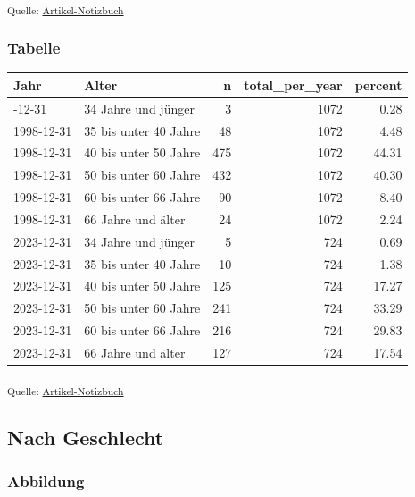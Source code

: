 \documentclass[
  ngerman,
  number,
  preprint,
  3p,
  twocolumn]{elsarticle}
\begin{document}
\textsubscript{Quelle:
\href{https://jakobschumacher.github.io/Update-Facharztmangel-im-oeffentlichen-Gesundheitsdienst/index.qmd.html}{Artikel-Notizbuch}}

\subsubsection{Tabelle}\label{tabelle-2}

\begin{longtable}[]{@{}llrrr@{}}
\toprule\noalign{}
Jahr & Alter & n & total\_per\_year & percent \\
\midrule\noalign{}
\endhead
\bottomrule\noalign{}
\endlastfoot
1998-12-31 & 34 Jahre und jünger & 3 & 1072 & 0.28 \\
1998-12-31 & 35 bis unter 40 Jahre & 48 & 1072 & 4.48 \\
1998-12-31 & 40 bis unter 50 Jahre & 475 & 1072 & 44.31 \\
1998-12-31 & 50 bis unter 60 Jahre & 432 & 1072 & 40.30 \\
1998-12-31 & 60 bis unter 66 Jahre & 90 & 1072 & 8.40 \\
1998-12-31 & 66 Jahre und älter & 24 & 1072 & 2.24 \\
2023-12-31 & 34 Jahre und jünger & 5 & 724 & 0.69 \\
2023-12-31 & 35 bis unter 40 Jahre & 10 & 724 & 1.38 \\
2023-12-31 & 40 bis unter 50 Jahre & 125 & 724 & 17.27 \\
2023-12-31 & 50 bis unter 60 Jahre & 241 & 724 & 33.29 \\
2023-12-31 & 60 bis unter 66 Jahre & 216 & 724 & 29.83 \\
2023-12-31 & 66 Jahre und älter & 127 & 724 & 17.54 \\
\end{longtable}

\textsubscript{Quelle:
\href{https://jakobschumacher.github.io/Update-Facharztmangel-im-oeffentlichen-Gesundheitsdienst/index.qmd.html}{Artikel-Notizbuch}}

\subsection{Nach Geschlecht}\label{nach-geschlecht}

\subsubsection{Abbildung}\label{abbildung-3}
\end{document}
